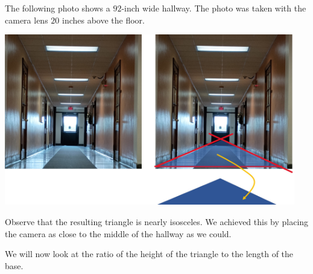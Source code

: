 \documentclass{ximera}
\begin{document}
\begin{exploration}\label{exp:hallway}



The following photo shows a $92$-inch wide hallway.  The photo was taken with the camera lens $20$ inches above the floor.

\begin{image}
         \includegraphics[width=5in]{hallwayExp.jpg}
\end{image}


Observe that the resulting triangle is nearly isosceles.  We achieved this by placing the camera as close to the middle of the hallway as we could.  

We will now look at the ratio of the height of the triangle to the length of the base.


\end{exploration}
\end{document}
